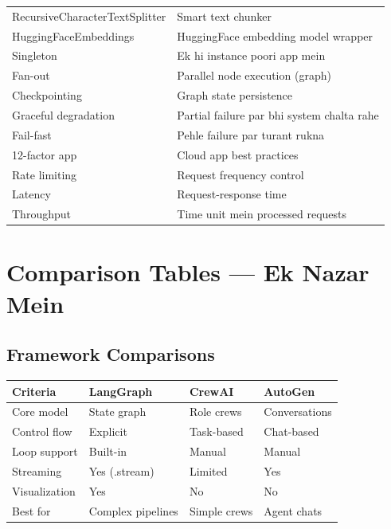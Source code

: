 \begin{longtable}{p{4.5cm} p{9.5cm}}
RecursiveCharacterTextSplitter & Smart text chunker \\
HuggingFaceEmbeddings & HuggingFace embedding model wrapper \\
Singleton & Ek hi instance poori app mein \\
Fan-out & Parallel node execution (graph) \\
Checkpointing & Graph state persistence \\
Graceful degradation & Partial failure par bhi system chalta rahe \\
Fail-fast & Pehle failure par turant rukna \\
12-factor app & Cloud app best practices \\
Rate limiting & Request frequency control \\
Latency & Request-response time \\
Throughput & Time unit mein processed requests \\
\bottomrule
\end{longtable}

\section{Comparison Tables --- Ek Nazar Mein}

\subsection{Framework Comparisons}

\begin{longtable}{p{3cm} p{3.8cm} p{3.8cm} p{3.8cm}}
\toprule
\textbf{Criteria} & \textbf{LangGraph} & \textbf{CrewAI} & \textbf{AutoGen} \\
\midrule
Core model & State graph & Role crews & Conversations \\
Control flow & Explicit & Task-based & Chat-based \\
Loop support & Built-in & Manual & Manual \\
Streaming & Yes (.stream) & Limited & Yes \\
Visualization & Yes & No & No \\
Best for & Complex pipelines & Simple crews & Agent chats \\
\bottomrule
\end{longtable}

